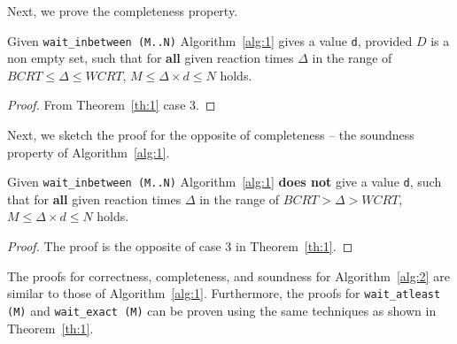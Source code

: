 Next, we prove the completeness property.
\begin{theorem}
  Given \texttt{wait\_inbetween (M..N)} Algorithm~\ref{alg:1} gives a
  value \texttt{d}, provided $D$ is a non empty set, such that for
  \textbf{all} given reaction times $\Delta$ in the range of $BCRT \leq
  \Delta \leq WCRT$, $M \leq \Delta \times d \leq N$ holds.
\end{theorem}
\begin{proof}
  From Theorem~\ref{th:1} case 3.
\end{proof}

Next, we sketch the proof for the opposite of completeness -- the
soundness property of Algorithm~\ref{alg:1}.

\begin{theorem}
  Given \texttt{wait\_inbetween (M..N)} Algorithm~\ref{alg:1}
  \textbf{does not} give a value \texttt{d}, such that for \textbf{all}
  given reaction times $\Delta$ in the range of $BCRT > \Delta > WCRT$,
  $M \leq \Delta \times d \leq N$ holds.
\end{theorem}

\begin{proof}
  The proof is the opposite of case 3 in Theorem~\ref{th:1}.
\end{proof}

The proofs for correctness, completeness, and soundness for
Algorithm~\ref{alg:2} are similar to those of
Algorithm~\ref{alg:1}. Furthermore, the proofs for \texttt{wait\_atleast
  (M)} and \texttt{wait\_exact (M)} can be proven using the same
techniques as shown in Theorem~\ref{th:1}.

